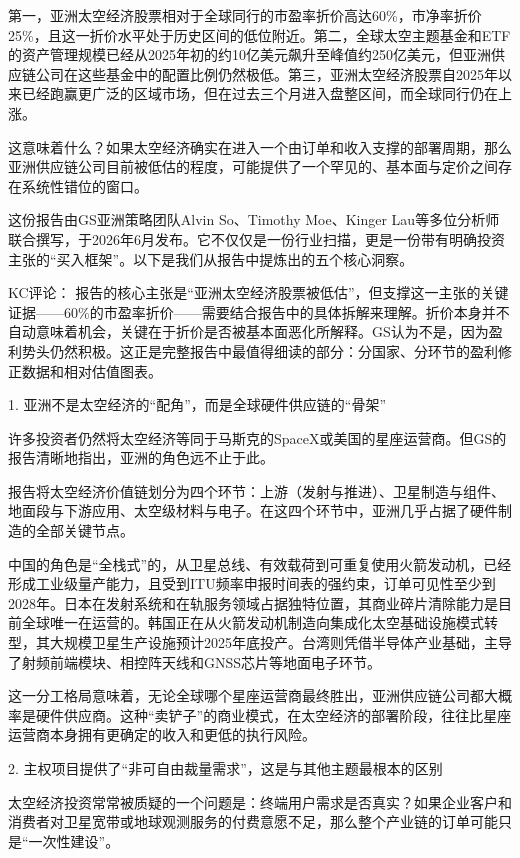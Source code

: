 \documentclass[11pt]{ctexart}
\begin{document}
第一，亚洲太空经济股票相对于全球同行的市盈率折价高达60\%，市净率折价25\%，且这一折价水平处于历史区间的低位附近。第二，全球太空主题基金和ETF的资产管理规模已经从2025年初的约10亿美元飙升至峰值约250亿美元，但亚洲供应链公司在这些基金中的配置比例仍然极低。第三，亚洲太空经济股票自2025年以来已经跑赢更广泛的区域市场，但在过去三个月进入盘整区间，而全球同行仍在上涨。

这意味着什么？如果太空经济确实在进入一个由订单和收入支撑的部署周期，那么亚洲供应链公司目前被低估的程度，可能提供了一个罕见的、基本面与定价之间存在系统性错位的窗口。

这份报告由GS亚洲策略团队Alvin So、Timothy Moe、Kinger Lau等多位分析师联合撰写，于2026年6月发布。它不仅仅是一份行业扫描，更是一份带有明确投资主张的“买入框架”。以下是我们从报告中提炼出的五个核心洞察。

KC评论： 报告的核心主张是“亚洲太空经济股票被低估”，但支撑这一主张的关键证据——60\%的市盈率折价——需要结合报告中的具体拆解来理解。折价本身并不自动意味着机会，关键在于折价是否被基本面恶化所解释。GS认为不是，因为盈利势头仍然积极。这正是完整报告中最值得细读的部分：分国家、分环节的盈利修正数据和相对估值图表。

1. 亚洲不是太空经济的“配角”，而是全球硬件供应链的“骨架”

许多投资者仍然将太空经济等同于马斯克的SpaceX或美国的星座运营商。但GS的报告清晰地指出，亚洲的角色远不止于此。

报告将太空经济价值链划分为四个环节：上游（发射与推进）、卫星制造与组件、地面段与下游应用、太空级材料与电子。在这四个环节中，亚洲几乎占据了硬件制造的全部关键节点。

中国的角色是“全栈式”的，从卫星总线、有效载荷到可重复使用火箭发动机，已经形成工业级量产能力，且受到ITU频率申报时间表的强约束，订单可见性至少到2028年。日本在发射系统和在轨服务领域占据独特位置，其商业碎片清除能力是目前全球唯一在运营的。韩国正在从火箭发动机制造向集成化太空基础设施模式转型，其大规模卫星生产设施预计2025年底投产。台湾则凭借半导体产业基础，主导了射频前端模块、相控阵天线和GNSS芯片等地面电子环节。

这一分工格局意味着，无论全球哪个星座运营商最终胜出，亚洲供应链公司都大概率是硬件供应商。这种“卖铲子”的商业模式，在太空经济的部署阶段，往往比星座运营商本身拥有更确定的收入和更低的执行风险。

2. 主权项目提供了“非可自由裁量需求”，这是与其他主题最根本的区别

太空经济投资常常被质疑的一个问题是：终端用户需求是否真实？如果企业客户和消费者对卫星宽带或地球观测服务的付费意愿不足，那么整个产业链的订单可能只是“一次性建设”。
\end{document}
